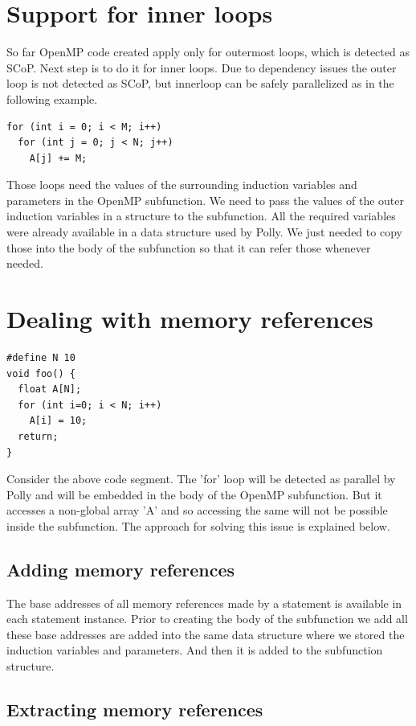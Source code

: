 \section{Support for inner loops}

So far OpenMP code created apply only for outermost loops, which is detected as SCoP. Next step is to do it for
inner loops. Due to dependency issues the outer loop is not detected as SCoP, but innerloop can be safely
parallelized as in the following example.
{\footnotesize
\begin{lstlisting}
for (int i = 0; i < M; i++)
  for (int j = 0; j < N; j++)
    A[j] += M;
\end{lstlisting}
}
Those loops need the values of the surrounding induction variables and parameters in the OpenMP subfunction. We need
to pass the values of the outer induction variables in a structure to the subfunction. All the required variables
were already available in a data structure used by Polly. We just needed to copy those into the body of the subfunction
so that it can refer those whenever needed.

\section{Dealing with memory references}
{\footnotesize
\begin{lstlisting}
#define N 10
void foo() {
  float A[N];
  for (int i=0; i < N; i++)
    A[i] = 10;
  return;
}
\end{lstlisting}
}
Consider the above code segment. The 'for' loop will be detected as parallel by Polly and will be embedded in the
body of the OpenMP subfunction. But it accesses a non-global array 'A' and so accessing the same will not be possible inside
the subfunction. The approach for solving this issue is explained below.

\subsection{Adding memory references}

The base addresses of all memory references made by a statement is available in each statement instance. Prior to creating the body
of the subfunction we add all these base addresses are added into the same data structure where we stored the induction variables and parameters.
And then it is added to the subfunction structure.

\subsection{Extracting memory references}

